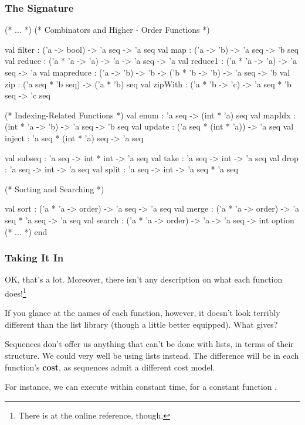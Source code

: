 \documentclass[aspectratio=169]{beamer}
\begin{document}
\begin{frame}[fragile]
  \frametitle{The  Signature}

  \tiny
  \begin{codeblock}
    (* ... *)
      (* Combinators and Higher - Order Functions *)

      val filter : ('a -> bool) -> 'a seq -> 'a seq
      val map : ('a -> 'b) -> 'a seq -> 'b seq
      val reduce : ('a * 'a -> 'a) -> 'a -> 'a seq -> 'a
      val reduce1 : ('a * 'a -> 'a) -> 'a seq -> 'a
      val mapreduce : ('a -> 'b) -> 'b -> ('b * 'b -> 'b) -> 'a seq -> 'b
      val zip : ('a seq * 'b seq) -> ('a * 'b) seq
      val zipWith : ('a * 'b -> 'c) -> 'a seq * 'b seq -> 'c seq

      (* Indexing-Related Functions *)
      val enum : 'a seq -> (int * 'a) seq
      val mapIdx : (int * 'a -> 'b) -> 'a seq -> 'b seq
      val update : ('a seq * (int * 'a)) -> 'a seq
      val inject : 'a seq * (int * 'a) seq -> 'a seq

      val subseq : 'a seq -> int * int -> 'a seq
      val take : 'a seq -> int -> 'a seq
      val drop : 'a seq -> int -> 'a seq
      val split : 'a seq -> int -> 'a seq * 'a seq

      (* Sorting and Searching *)

      val sort : ('a * 'a -> order) -> 'a seq -> 'a seq
      val merge : ('a * 'a -> order) -> 'a seq * 'a seq -> 'a seq
      val search : ('a * 'a -> order) -> 'a -> 'a seq -> int option
      (* ... *)
    end
  \end{codeblock}
\end{frame}

\begin{frame}[fragile]
  \frametitle{Taking It In}

  OK, that's a lot. Moreover, there isn't any description on what each
  function does!\footnote{There is at the online reference, though.}

  \vspace{\fill}

  If you glance at the names of each function, however, it doesn't look
  terribly different than the list library (though a little better equipped).
  What gives?

  \pause
  \vspace{\fill}

  Sequences don't offer us anything that can't be done with lists, in terms
  of their structure. We could very well be using lists instead. The difference
  will be in each function's \textbf{cost}, as sequences admit a different
  cost model.

  \pause
  \vspace{\fill}


  \pause
  \vspace{\fill}

  For instance, we can execute  within constant time, for a
  constant function .
\end{frame}
\end{document}
